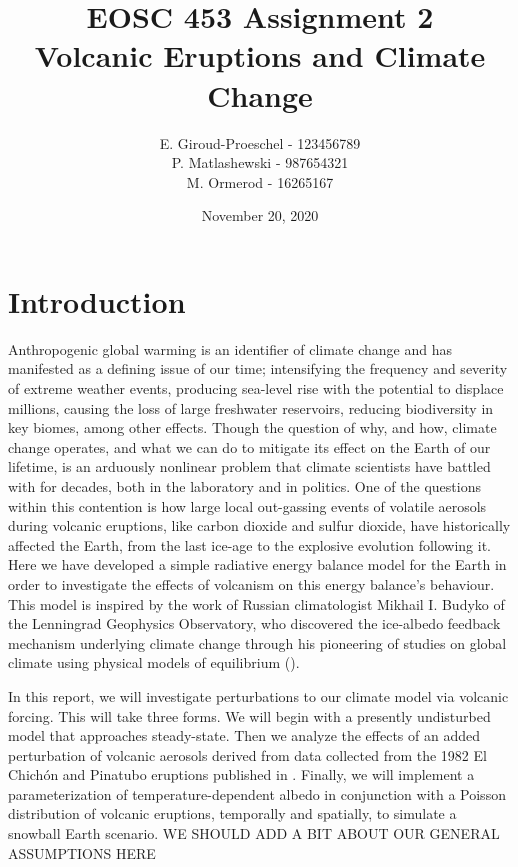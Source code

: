 \documentclass{article}
\title{EOSC 453 Assignment 2\\
\large Volcanic Eruptions and Climate Change}
\author{E. Giroud-Proeschel - 123456789 \\
P. Matlashewski - 987654321\\
M. Ormerod - 16265167
}
\date{November 20, 2020}
\begin{document}
\maketitle

\tableofcontents

\newpage

\section{Introduction}
Anthropogenic global warming is an identifier of climate change and has manifested as a defining issue of our time; intensifying the frequency and severity of extreme weather events, producing sea-level rise with the potential to displace millions, causing the loss of large freshwater reservoirs, reducing biodiversity in key biomes, among other effects. Though the question of why, and how, climate change operates, and what we can do to mitigate its effect on the Earth of our lifetime, is an arduously nonlinear problem that climate scientists have battled with for decades, both in the laboratory and in politics. One of the questions within this contention is how large local out-gassing events of volatile aerosols during volcanic eruptions, like carbon dioxide and sulfur dioxide, have historically affected the Earth, from the last ice-age to the explosive evolution following it. Here we have developed a simple radiative energy balance model for the Earth in order to investigate the effects of volcanism on this energy balance's behaviour. This model is inspired by the work of Russian climatologist Mikhail I. Budyko of the Lenningrad Geophysics Observatory, who discovered the ice-albedo feedback mechanism underlying climate change through his pioneering of studies on global climate using physical models of equilibrium (\cite{budyko_albedo}).

In this report, we will investigate perturbations to our climate model via volcanic forcing. This will take three forms. We will begin with a presently undisturbed model that approaches steady-state. Then we analyze the effects of an added perturbation of volcanic aerosols derived from data collected from the 1982 El Chichón and Pinatubo eruptions published in \cite{robock}. Finally, we will implement a parameterization of temperature-dependent albedo in conjunction with a Poisson distribution of volcanic eruptions, temporally and spatially, to simulate a snowball Earth scenario. WE SHOULD ADD A BIT ABOUT OUR GENERAL ASSUMPTIONS HERE
\end{document}
